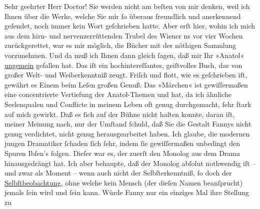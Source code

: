 \pstart{}Sehr geehrter Herr Doctor!\pend\vspace{0.5em}
\pstart
           Sie werden nicht am beſten von mir denken, weil ich Ihnen über die Werke, welche Sie mir
               ſo überaus freundlich und anerkennend geſendet, noch immer kein Wort geſchrieben
               hatte. Aber erſt hier, wohin ich mich aus dem hirn- und nervenzerrüttenden Trubel des
                  Wiener \damage{\textcolor{gray}{Lebe}}ns vor vier Wochen zurückgerettet, war es mir möglich, die Bücher mit der
               nöthigen Sammlung vorzunehmen. Und da muß ich Ihnen dann gleich ſagen, daß mir Ihr
                  »Anatol« \uline{ungemein} gefallen hat. Das iſt ein hochintereſſantes, geiſtvolles Buch, das
               von großer Welt- und Weiberkenntniß zeugt. Friſch und flott, wie es geſchrieben iſt,
               gewährt es Einem beim Leſen großen Genuß. Das »Märchen« ist gewiſſermaßen eine concentrierte Vertiefung der Anatol-Themen und hat, da ich ähnliche Seelenqualen und
               Conflicte in meinem Leben oft genug durchgemacht, ſehr ſtark auf mich gewirkt. Daß es
               ſich auf der Bühne nicht halten konnte, daran iſt, meiner Meinung nach, nur der
               Umſtand ſchuld, daß Sie die Gestalt Fannys nicht genug verdichtet, nicht genug herausgearbeitet haben. Ich
               glaube, die modernen jungen Dramatiker {\pb}ſchaden ſich
               ſehr, indem ſie gewiſſermaßen unbedingt den Spuren Ibſen’s folgen. Dieſer war es, der zuerſt den Monolog aus dem Drama
               hinausgedrängt hat. Ich aber behaupte, daß der Monolog abſolut nothwendig iſt – und
               zwar als Moment – wenn auch nicht der Selbſterkenntniß, ſo doch der \uline{Selbſtbeobachtung}, ohne welche kein Mensch (der dieſen
               Namen beanſprucht) jemals ſein wird und ſein kann. Würde Fanny nur ein einziges Mal ihre Stellung zu
